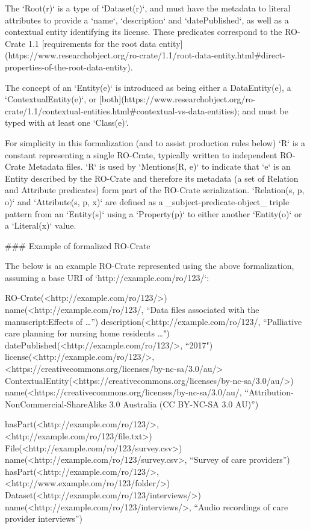 The `Root(r)` is a type of `Dataset(r)`, and must have the metadata to literal attributes to provide a `name`, `description` and `datePublished`, as well as a contextual entity identifying its license. These predicates correspond to the RO-Crate 1.1 [requirements for the root data entity](https://www.researchobject.org/ro-crate/1.1/root-data-entity.html#direct-properties-of-the-root-data-entity).

The concept of an `Entity(e)` is introduced as being either a DataEntity(e), a `ContextualEntity(e)`, or [both](https://www.researchobject.org/ro-crate/1.1/contextual-entities.html#contextual-vs-data-entities); and must be typed with at least one `Class(e)`. 

For simplicity in this formalization (and to assist production rules below) `R` is a constant representing a single RO-Crate, typically written to independent RO-Crate Metadata files. `R` is used by `Mentions(R, e)` to indicate that `e` is an Entity described by the RO-Crate and therefore its metadata (a set of Relation and Attribute predicates) form part of the RO-Crate serialization. `Relation(s, p, o)` and `Attribute(s, p, x)` are defined as a _subject-predicate-object_ triple pattern from an `Entity(s)` using a `Property(p)` to either another `Entity(o)` or a `Literal(x)` value.


### Example of formalized RO-Crate 

The below is an example RO-Crate represented using the above formalization, assuming a base URI of `http://example.com/ro/123/`:

    RO-Crate(<http://example.com/ro/123/>)
    name(<http://example.com/ro/123/, 
        “Data files associated with the manuscript:Effects of …”)
    description(<http://example.com/ro/123/, 
        “Palliative care planning for nursing home residents …")
    datePublished(<http://example.com/ro/123/>, “2017")
    license(<http://example.com/ro/123/>, 
        <https://creativecommons.org/licenses/by-nc-sa/3.0/au/>
    ContextualEntity(<https://creativecommons.org/licenses/by-nc-sa/3.0/au/>)
    name(<https://creativecommons.org/licenses/by-nc-sa/3.0/au/, 
        “Attribution-NonCommercial-ShareAlike 3.0 Australia (CC BY-NC-SA 3.0 AU)”)

    hasPart(<http://example.com/ro/123/>, <http://example.com/ro/123/file.txt>)
    File(<http://example.com/ro/123/survey.csv>)
    name(<http://example.com/ro/123/survey.csv>, “Survey of care providers”)
    hasPart(<http://example.com/ro/123/>, <http://www.example.om/ro/123/folder/>)
    Dataset(<http://example.com/ro/123/interviews/>)
    name(<http://example.com/ro/123/interviews/>, 
        “Audio recordings of care provider interviews”)

